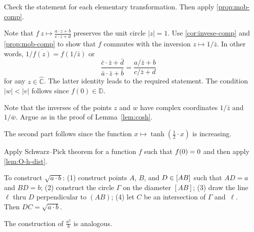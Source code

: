  
Check the statement for each elementary transformation.
Then apply \ref{prop:mob-comp}.

Note that $f\:z\mapsto\tfrac{a\cdot z+b}{c\cdot z+d}$ preserves the unit circle $|z|=1$.
Use \ref{cor:invese-comp} and \ref{prop:mob-comp} to show that $f$ commutes with the inversion $z\mapsto 1/\bar z$.
In other words, $1/\overline{f(z)}=f(1/\bar z)$ or
\[\frac{\bar c\cdot \bar z+\bar d}{\bar a\cdot \bar z+\bar b}
=\frac{a/\bar z+b}{c/\bar z+d}\]
for any $z\in\hat{\mathbb{C}}$.
The latter identity leads to the required statement. 
The condition $|w|<|v|$ follows since $f(0)\in\mathbb{D}$.

Note that the inverses of the points $z$ and $w$ have complex coordinates $1/\bar z$ and $1/\bar w$.
Argue as in the proof of Lemma~\ref{lem:cosh}.

The second part follows since the function $x\mapsto \tanh(\tfrac12\cdot x)$ is increasing.

Apply Schwarz--Pick theorem for a function $f$ such that $f(0)\z=0$ and then apply \ref{lem:O-h-dist}.

\setcounter{eqtn}{0}

%
%
%
%

To construct  $\sqrt{a\cdot b}$:
(1) construct points $A$, $B$, and $D\z\in [AB]$
such that $AD=a$ and $BD=b$;
(2) construct the circle $\Gamma$ on the diameter $[AB]$;
(3) draw the line $\ell$ thru $D$ perpendicular to $(AB)$; 
(4) let $C$ be an intersection of $\Gamma$ and~$\ell$.
Then $DC= \sqrt{a\cdot b}$.


The construction of $\tfrac{a^2}b$ is analogous.

